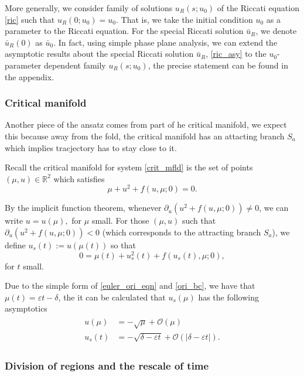 \documentclass[letterpaper,11pt]{article}
\newcommand{\rmO}{\mathcal{O}}
\newcommand{\eps}{\varepsilon}
\numberwithin{equation}{section}
\theoremstyle{plain}
\begin{document}
More generally, we consider family of solutions  $u_R(s; u_0)$ of the Riccati equation  \eqref{ric} such that $u_R(0; u_0) = u_0$. That is, we take the initial condition $u_0$ as a parameter to the Riccati equation. For the special Riccati solution $\bar{u}_R$, we denote $\bar{u}_R(0) $ as $\bar{u}_0$. In fact, using simple phase plane analysis, we can extend the asymptotic results about the special Riccati solution $\bar{u}_R$, \eqref{ric_asy} to the $u_0$-parameter dependent family $u_R(s; u_0)$, the precise statement can be found in the appendix.

\subsubsection{Critical manifold}\label{c_mfld}
Another piece of the ansatz comes from part of  he critical manifold, we expect this because away from the fold, the critical manifold has an attacting branch $S_a$ which implies tracjectory has to stay close to it. 

Recall the critical manifold for system \eqref{crit_mfld} is the set of points $(\mu, u) \in \mathbb{R}^2$ which satisfies
\begin{equation} \label{crit_mfld}
\mu + u^2 + f(u,\mu; 0) =  0.
\end{equation}

By the implicit function theorem, whenever $\partial_u( u^2+f(u,\mu;0) ) \neq 0$, we can write $u=u(\mu),$ for $\mu$ small. For those $(\mu, u)$ such that $\partial_u( u^2+f(u,\mu;0) )<0$ (which corresponds to the attracting branch $S_a$), we define $u_s(t):= u(\mu(t))$ so that
\begin{equation}\label{singular}
0 = \mu(t) + u_s^2(t)+f(u_s(t),\mu; 0),
\end{equation}
for $t$ small.  

Due to the simple form of \eqref{euler_ori_eqn} and \eqref{ori_bc}, we have that $\mu(t)= \eps t-\delta$, the it can be calculated that $u_s(\mu)$ has the following asymptotics
\begin{align}\label{singularAsy}
\begin{split}
u(\mu) &= -\sqrt{\mu} + \rmO(\mu)\\
u_s(t) &= -\sqrt{\delta-\eps t} + \rmO(|\delta-\eps t|).
\end{split}
\end{align}


\subsubsection{Division of regions and the rescale of time}\label{t_sigma}
\end{document}
